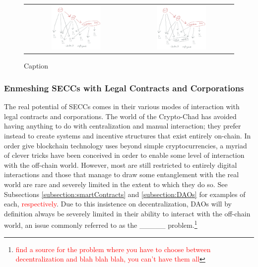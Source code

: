 \documentclass{article}[10pt]
\begin{document}
\begin{figure}[!ht]
    \centering
    \begin{tabular}{c|c}
    \includegraphics[width=0.5\textwidth]{figures/IMG_1013.pdf} &
    \includegraphics[width=0.5\textwidth]{figures/IMG_1014.pdf} \\
    \end{tabular}
    \caption{Caption}
    \label{fig:subsetCluster}
\end{figure}






\subsubsection{Enmeshing SECCs with Legal Contracts and Corporations}
\label{subsubsection:enmeshment2}

The real potential of SECCs comes in their various modes of interaction with legal contracts and corporations.
The world of the Crypto-Chad has avoided having anything to do with centralization and manual interaction; they prefer instead to create systems and incentive structures that exist entirely on-chain.
In order give blockchain technology uses beyond simple cryptocurrencies, a myriad of clever tricks have been conceived in order to enable some level of interaction with the off-chain world.
However, most are still restricted to entirely digital interactions and those that manage to draw some entanglement with the real world are rare and severely limited in the extent to which they do so.
See Subsections \ref{subsection:smartContracts} and \ref{subsection:DAOs} for examples of each, \textcolor{red}{respectively}.
Due to this insistence on decentralization, DAOs will by definition always be severely limited in their ability to interact with the off-chain world, an issue commonly referred to as the \_\_\_\_\_ problem.\footnote{
    \textcolor{red}{find a source for the problem where you have to choose between decentralization and blah blah blah, you can't have them all}}\par
\end{document}
